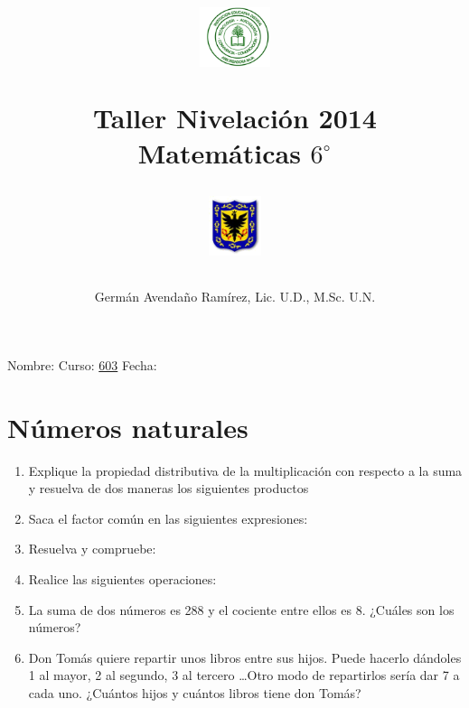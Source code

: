 \documentclass[10pt,twoside]{article}
\author{Germ\'an Avenda\~no Ram\'irez, Lic. U.D., M.Sc. U.N.}
\title{\begin{minipage}{.2\textwidth}
\includegraphics[height=1.75cm]{Images/logo-colegio.png}\end{minipage}
\begin{minipage}{.55\textwidth}
\begin{center}
Taller Nivelación 2014 \\
Matemáticas $6^{\circ}$
\end{center}
\end{minipage}\hfill
\begin{minipage}{.2\textwidth}
\includegraphics[height=1.75cm]{Images/logo-sed.png} 
\end{minipage}}
\date{}
\begin{document}
\maketitle
Nombre: \hrulefill Curso: \underline{603} Fecha: \underline{\hspace*{2.5cm}}
\section*{N\'{u}meros naturales}
\begin{enumerate}
\item Explique la propiedad distributiva de la multiplicaci\'{o}n con respecto a la suma y resuelva de dos maneras los siguientes productos
\begin{enumerate}
\end{enumerate}
\item Saca el factor común en las siguientes expresiones:
\begin{enumerate}
\end{enumerate}
\item Resuelva y compruebe:
\begin{enumerate}
\end{enumerate}
\item Realice las siguientes operaciones:
\begin{enumerate}
\end{enumerate}
\item La suma de dos números es 288 y el cociente entre ellos es 8. ¿Cuáles son los números?
\item Don Tomás quiere repartir unos libros entre sus hijos. Puede hacerlo dándoles 1 al mayor, 2 al segundo, 3 al tercero \ldots Otro modo de repartirlos sería dar 7 a cada uno. ¿Cuántos hijos y cuántos libros tiene don Tomás?
\end{enumerate}
\end{document}
